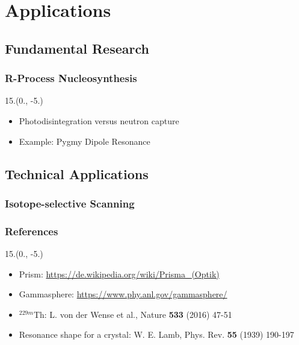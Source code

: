 \documentclass{beamer}
\begin{document}
\section{Applications}

\subsection{Fundamental Research}

\begin{frame}
    \frametitle{R-Process Nucleosynthesis}
    \begin{textblock}{15.}(0., -5.)
        \begin{itemize}
            \item Photodisintegration versus neutron capture
            \item Example: Pygmy Dipole Resonance
        \end{itemize}
    \end{textblock}    
\end{frame}

\subsection{Technical Applications}

\begin{frame}
    \frametitle{Isotope-selective Scanning}
\end{frame}

\begin{frame}
    \frametitle{References}
    \begin{textblock}{15.}(0., -5.)
    \begin{itemize}
        \item Prism: \url{https://de.wikipedia.org/wiki/Prisma_(Optik)}
        \item Gammasphere: \url{https://www.phy.anl.gov/gammasphere/}
        \item $^{229m}$Th: L. von der Wense et al., Nature \textbf{533} (2016) 47-51
        \item Resonance shape for a crystal: W. E. Lamb, Phys. Rev. \textbf{55} (1939) 190-197
    \end{itemize}
    \end{textblock}
\end{frame}
\end{document}
